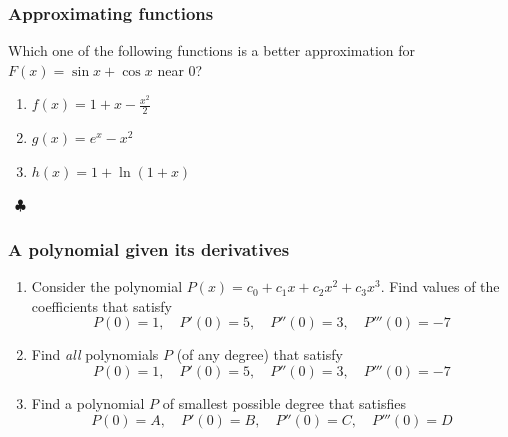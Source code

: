 \begin{frame}[t]
	\frametitle{Approximating functions }

	Which one of the following functions is a better approximation for \;
	$\displaystyle F(x) = \sin x + \cos x$ \; near 0?
	\vspace{.2cm}
	\begin{enumerate}
		\item $\displaystyle f(x) = 1 + x - \frac{x^{2}}{2}$
			\vspace{.2cm}

		\item $\displaystyle g(x) = e^{x}-x^{2}$
			\vspace{.2cm}

		\item $\displaystyle h(x) = 1 + \ln (1+x)$
	\end{enumerate}

	\ \hfill \href{https://www.desmos.com/calculator/1hqedw17c8}{$\clubsuit$}
\end{frame}

\begin{frame}[t]
	\fontsize{13}{13}\selectfont
	\frametitle{A polynomial given its derivatives}

	\begin{enumerate}
		\item Consider the polynomial $\displaystyle P(x)= c_{0}+ c_{1}x + c_{2}x^{2}
			+ c_{3}x^{3}$. Find values of the coefficients that satisfy
			\[
				P(0) = 1, \quad P'(0) = 5, \quad P''(0) = 3, \quad P'''(0) = -7
			\]

		\item Find \emph{all} polynomials $P$ (of any degree) that satisfy
			\[
				P(0) = 1, \quad P'(0) = 5, \quad P''(0) = 3, \quad P'''(0) = -7
			\]

		\item Find a polynomial $P$ of smallest possible degree that satisfies
			\[
				P(0) = A, \quad P'(0) = B, \quad P''(0) = C, \quad P'''(0) = D
			\]
	\end{enumerate}
\end{frame}

